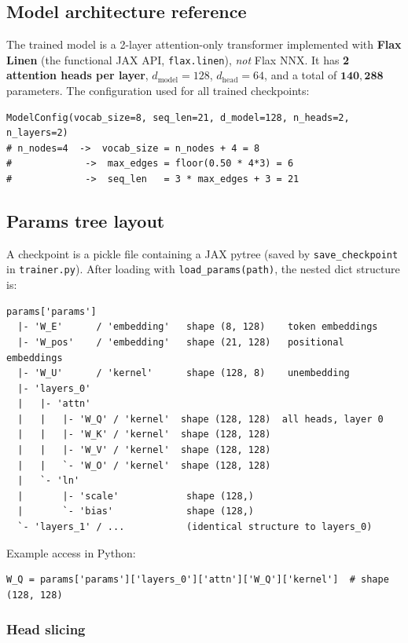 \documentclass[11pt, a4paper]{article}
\begin{document}
\subsection{Model architecture reference}
\label{sec:model-ref}

The trained model is a 2-layer attention-only transformer implemented with
\textbf{Flax Linen} (the functional JAX API, \texttt{flax.linen}),
\emph{not} Flax NNX. It has \textbf{2 attention heads per layer},
$d_{\text{model}} = 128$, $d_{\text{head}} = 64$, and a total of
$\mathbf{140{,}288}$ parameters. The configuration used for all trained
checkpoints:

\begin{lstlisting}
ModelConfig(vocab_size=8, seq_len=21, d_model=128, n_heads=2, n_layers=2)
# n_nodes=4  ->  vocab_size = n_nodes + 4 = 8
#             ->  max_edges = floor(0.50 * 4*3) = 6
#             ->  seq_len   = 3 * max_edges + 3 = 21
\end{lstlisting}

\subsection{Params tree layout}
\label{sec:params-tree}

A checkpoint is a pickle file containing a JAX pytree (saved by
\texttt{save\_checkpoint} in \texttt{trainer.py}). After loading with
\texttt{load\_params(path)}, the nested dict structure is:

\begin{lstlisting}
params['params']
  |- 'W_E'      / 'embedding'   shape (8, 128)    token embeddings
  |- 'W_pos'    / 'embedding'   shape (21, 128)   positional embeddings
  |- 'W_U'      / 'kernel'      shape (128, 8)    unembedding
  |- 'layers_0'
  |   |- 'attn'
  |   |   |- 'W_Q' / 'kernel'  shape (128, 128)  all heads, layer 0
  |   |   |- 'W_K' / 'kernel'  shape (128, 128)
  |   |   |- 'W_V' / 'kernel'  shape (128, 128)
  |   |   `- 'W_O' / 'kernel'  shape (128, 128)
  |   `- 'ln'
  |       |- 'scale'            shape (128,)
  |       `- 'bias'             shape (128,)
  `- 'layers_1' / ...           (identical structure to layers_0)
\end{lstlisting}

Example access in Python:
\begin{lstlisting}
W_Q = params['params']['layers_0']['attn']['W_Q']['kernel']  # shape (128, 128)
\end{lstlisting}

\subsubsection{Head slicing}
\end{document}
